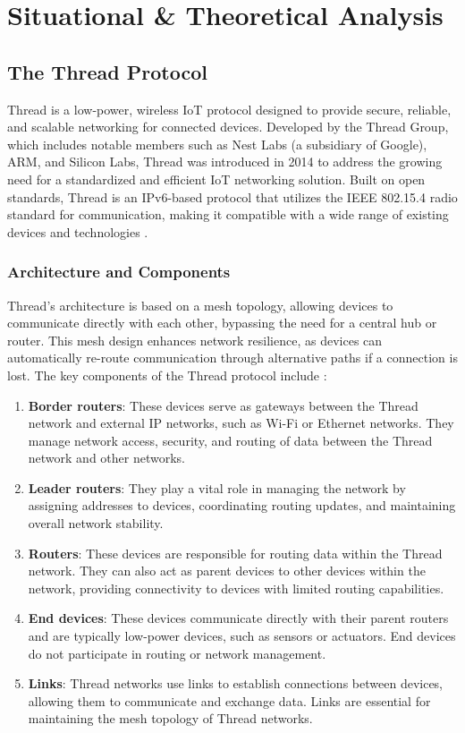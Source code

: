 \chapter{Situational \& Theoretical Analysis}\label{chap:situational_theoretical_analysis}

\section{The Thread Protocol}\label{sec:the_thread_protocol}
Thread is a low-power, wireless IoT protocol designed to provide secure, reliable, and scalable networking for connected devices. Developed by the Thread Group, which includes notable members such as Nest Labs (a subsidiary of Google), ARM, and Silicon Labs, Thread was introduced in 2014 to address the growing need for a standardized and efficient IoT networking solution. Built on open standards, Thread is an IPv6-based protocol that utilizes the IEEE 802.15.4 radio standard for communication, making it compatible with a wide range of existing devices and technologies \cite{Thread_Group_Fundamentals}.


\subsection{Architecture and Components}
Thread's architecture is based on a mesh topology, allowing devices to communicate directly with each other, bypassing the need for a central hub or router. This mesh design enhances network resilience, as devices can automatically re-route communication through alternative paths if a connection is lost. The key components of the Thread protocol include \cite{Thread_Group_Fundamentals}:

\begin{enumerate}
    \item \textbf{Border routers}: These devices serve as gateways between the Thread network and external IP networks, such as Wi-Fi or Ethernet networks. They manage network access, security, and routing of data between the Thread network and other networks.
    \item \textbf{Leader routers}: They play a vital role in managing the network by assigning addresses to devices, coordinating routing updates, and maintaining overall network stability.
    \item \textbf{Routers}: These devices are responsible for routing data within the Thread network. They can also act as parent devices to other devices within the network, providing connectivity to devices with limited routing capabilities.
    \item \textbf{End devices}: These devices communicate directly with their parent routers and are typically low-power devices, such as sensors or actuators. End devices do not participate in routing or network management.
    \item \textbf{Links}: Thread networks use links to establish connections between devices, allowing them to communicate and exchange data. Links are essential for maintaining the mesh topology of Thread networks.
\end{enumerate}


